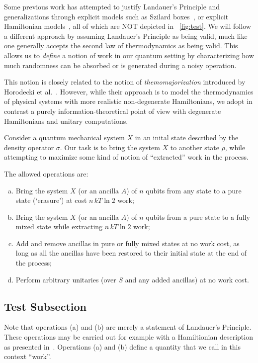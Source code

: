 \documentclass[12pt,a4paper]{article}
\begin{document}
Some previous work has attempted to justify Landauer's Principle and generalizations
through explicit models such as Szilard
boxes~\cite{Szilard1929ZeitschriftFuerPhysik,Dahlsten2011NJP_inadequacy}, or explicit
Hamiltonian models~\cite{Alicki2004_hamiltonian}, all of which are NOT depicted in
\figurename~\ref{fig:test}. We will follow a different approach by assuming Landauer's
Principle as being valid, much like one generally accepts the second law of thermodynamics
as being valid. This allows us to {\em define} a notion of work in our quantum setting by
characterizing how much randomness can be absorbed or is generated during a noisy
operation.

This notion is closely related to the notion of {\em themomajorization} introduced by
Horodecki et al.~\cite{Horodecki2013_ThermoMaj}. However, while their approach is to model
the thermodynamics of physical systems with more realistic non-degenerate Hamiltonians, we
adopt in contrast a purely information-theoretical point of view with degenerate
Hamiltonians and unitary computations.

Consider a quantum mechanical system $X$ in an inital state described by the density operator $\sigma$.
Our task is to bring the system $X$ to another state $\rho$, while attempting to maximize some kind of notion
of ``extracted'' work in the process.

The allowed operations are:
\begin{enumerate}[(a)]
\item Bring the system $X$ (or an ancilla $A$) of $n$ qubits from any state to a pure state (`erasure') at
  cost $n\,kT\ln 2$ work;
\item Bring the system $X$ (or an ancilla $A$) of $n$ qubits from a pure state to a fully mixed state while
  extracting $n\,kT\ln 2$ work;
\item Add and remove ancillas in pure or fully mixed states at no work cost, as long as all the ancillas have
  been restored to their initial state at the end of the process;
\item Perform arbitrary unitaries (over $S$ and any added ancillas) at no work cost.
\end{enumerate}

\subsection{Test Subsection}

Note that operations (a) and (b) are merely a statement of Landauer's Principle. These operations
may be carried out for example with a Hamiltionian description as presented in~\cite{delRio2011Nature}.
Operations (a) and (b) define a quantity that we call in this context ``work''.
\end{document}

